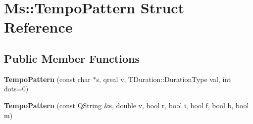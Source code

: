 \hypertarget{struct_ms_1_1_tempo_pattern}{}\section{Ms\+:\+:Tempo\+Pattern Struct Reference}
\label{struct_ms_1_1_tempo_pattern}
\subsection*{Public Member Functions}
\begin{DoxyCompactItemize}
\item 
\mbox{\label{struct_ms_1_1_tempo_pattern_a87d21f2ac2b594f92ff697b4d9d7dc28}} 
{\bfseries Tempo\+Pattern} (const char $\ast$s, qreal v, T\+Duration\+::\+Duration\+Type val, int dots=0)
\item 
\mbox{\label{struct_ms_1_1_tempo_pattern_a7eef45ead91c83a69fcf959e10e09f90}} 
{\bfseries Tempo\+Pattern} (const Q\+String \&s, double v, bool r, bool i, bool f, bool b, bool m)
\end{DoxyCompactItemize}
